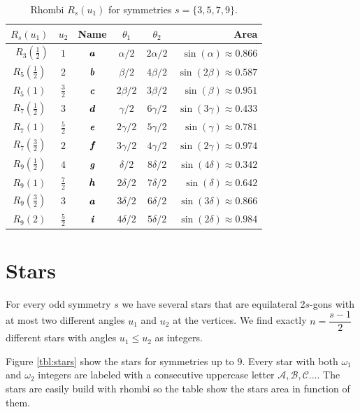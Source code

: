 \documentclass[11pt]{article}
\def\mathbi#1{\textbf{\em #1}}
\begin{document}
\begin{table}[h]
\begin{center}
\begin{tabular}{|c|c|c|c c| r |}
\hline
$R_s(u_1)$ & $u_2$ & Name & $\theta_1$ & $\theta_2$ & Area \\ \hline\
$R_3(\frac{1}2)$ & $1$  & $\mathbi{a}$ & $\alpha/2$ & $2\alpha/2$  & $\sin(\alpha) \approx 0.866$ \\[0.5ex]
\hline
$R_5(\frac{1}2)$ & $2$  & $\mathbi{b}$ & $\beta/2$  & $4\beta/2$   & $\sin(2\beta) \approx 0.587$\\[0.5ex]
$R_5(1)$ & $\frac{3}2$  & $\mathbi{c}$ & $2\beta/2$ & $3\beta/2$   & $\sin(\beta) \approx 0.951$\\[0.5ex]
\hline
$R_7(\frac{1}2)$ & $3$  & $\mathbi{d}$ & $\gamma/2$ & $6\gamma/2$  & $\sin(3\gamma) \approx 0.433$\\[0.5ex]
$R_7(1)$ & $\frac{5}2$ & $\mathbi{e}$ & $2\gamma/2$ & $5\gamma/2$ & $\sin(\gamma) \approx 0.781$\\[0.5ex]
$R_7(\frac{3}2)$ & $2$  & $\mathbi{f}$ & $3\gamma/2$ & $4\gamma/2$ & $\sin(2\gamma) \approx 0.974$\\[0.5ex]
\hline
$R_9(\frac{1}2)$ & $4$ & $\mathbi{g}$ & $\delta/2$ & $8\delta/2$  & $\sin(4\delta) \approx 0.342$\\[0.5ex]
$R_9(1)$ & $\frac{7}2$ & $\mathbi{h}$ & $2\delta/2$ & $7\delta/2$ & $\sin(\delta) \approx 0.642$\\[0.5ex]
$R_9(\frac{3}2)$ & $3$ & $\mathbi{a}$ & $3\delta/2$ & $6\delta/2$ & $\sin(3\delta) \approx 0.866$\\[0.5ex]
$R_9(2)$ & $\frac{5}2$ & $\mathbi{i}$ & $4\delta/2$ & $5\delta/2$ & $\sin(2\delta) \approx 0.984$\\[0.5ex]
\hline
\end{tabular}
\caption{Rhombi $R_s(u_1)$ for symmetries $s=\{3,5,7,9\}$.} 
\label{tbl:rhombi}
\end{center}
\end{table}

\section{Stars}

For every odd symmetry $s$ we have several stars that are equilateral 2$s$-gons with at most two different angles $u_1$ and $u_2$ at the vertices. We find exactly $n = \dfrac{s-1}2$ different stars with angles $u_1 \leq u_2$ as integers.

Figure \ref{tbl:stars} show the stars for symmetries up to $9$. Every star with both $\omega_1$ and $\omega_2$ integers are labeled with a consecutive uppercase letter $\mathcal{A}, \mathcal{B}, \mathcal{C}...$. The stars are easily build with rhombi so the table show the stars area in function of them.
\end{document}
